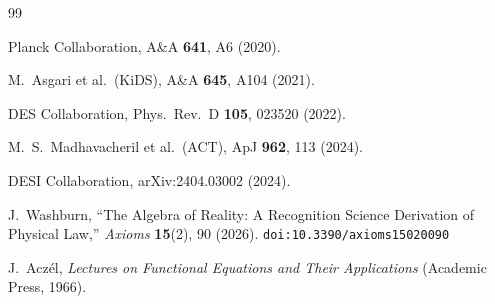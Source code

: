 \documentclass[12pt,a4paper]{article}
\theoremstyle{definition}
\theoremstyle{remark}
\begin{document}
\begin{thebibliography}{99}

Planck Collaboration, A\&A \textbf{641}, A6 (2020).

M.~Asgari et al.\ (KiDS), A\&A \textbf{645}, A104 (2021).

DES Collaboration, Phys.\ Rev.\ D \textbf{105}, 023520 (2022).

M.~S.~Madhavacheril et al.\ (ACT), ApJ \textbf{962}, 113 (2024).

DESI Collaboration, arXiv:2404.03002 (2024).

J.~Washburn, ``The Algebra of Reality: A Recognition Science Derivation
of Physical Law,'' \emph{Axioms} \textbf{15}(2), 90 (2026).
\texttt{doi:10.3390/axioms15020090}

J.~Acz\'el, \emph{Lectures on Functional Equations and Their
Applications} (Academic Press, 1966).

\end{thebibliography}
\end{document}
